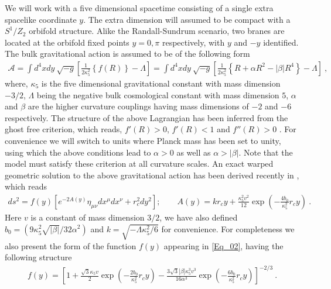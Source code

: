\documentclass{article}
\begin{document}
We will work with a five dimensional spacetime consisting of a single extra spacelike coordinate $y$. The extra dimension will assumed to be compact with a $S^{1}/Z_{2}$ orbifold structure. Alike the Randall-Sundrum scenario, two branes are located at the orbifold fixed points $y=0,\pi$ respectively, with $y$ and $-y$ identified. The bulk gravitational action is assumed to be of the following form
\begin{align}\label{Eq_01}
\mathcal{A}=\int d^{4}xdy~\sqrt{-g}\left[\frac{1}{2\kappa _{5}^{2}}\left\lbrace f(R)\right\rbrace -\Lambda\right]=\int d^{4}xdy~\sqrt{-g}\left[\frac{1}{2\kappa _{5}^{2}}\left\lbrace R+\alpha R^{2}-|\beta| R^{4}\right\rbrace -\Lambda\right]~,
\end{align}
where, $\kappa _{5}$ is the five dimensional gravitational constant with mass dimension $-3/2$, $\Lambda$ being the negative bulk cosmological constant with mass dimension $5$, $\alpha$ and $\beta$ are the higher curvature couplings having mass dimensions of $-2$ and $-6$ respectively. The structure of the above Lagrangian has been inferred from the ghost free criterion, which reads, $f'(R)>0$, $f'(R)<1$ and $f''(R)>0$ \cite{Pogosian:2007sw}. For convenience we will switch to units where Planck mass has been set to unity, using which the above conditions lead to $\alpha >0$ as well as $\alpha >|\beta|$. Note that the model must satisfy these criterion at all curvature scales. An exact warped geometric solution to the above gravitational action has been derived recently in \cite{Chakraborty:2016ydo}, which reads
\begin{align}\label{Eq_02}
ds^{2}=f(y)\left[e^{-2A(y)}\eta _{\mu \nu}dx^{\mu}dx^{\nu}+r_{c}^{2}dy^{2}\right];\qquad A(y)=kr_{c}y+\frac{\kappa _{5}^{2}v^{2}}{12}\exp \left(-\frac{4b_{0}}{\kappa _{5} ^{2}}r_{c}y \right)~.
\end{align}
Here $v$ is a constant of mass dimension $3/2$, we have also defined $b_{0}=(9\kappa _{5}^{2}\sqrt{|\beta|}/32\alpha ^{2})$ and $k=\sqrt{-\Lambda \kappa _{5}^{2}/6}$ for convenience. For completeness we also present the form of the function $f(y)$ appearing in \ref{Eq_02}, having the following structure
\begin{align}\label{Eq_03}
f(y)=\left[1+\frac{\sqrt{3}\kappa _{5}v}{2}\exp\left(-\frac{2b_{0}}{\kappa _{5}^{2}}r_{c}y\right)
-\frac{3\sqrt{3}|\beta|\kappa _{5}^{3}v^{3}}{16\alpha ^{3}}\exp\left(-\frac{6b_{0}}{\kappa _{5}^{2}}r_{c}y\right)\right]^{-2/3}~.
\end{align}
\end{document}
